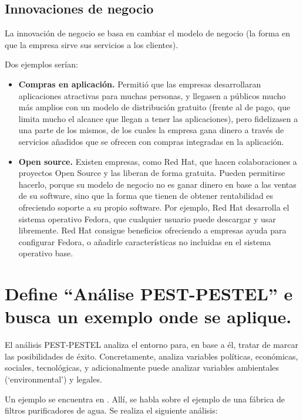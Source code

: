 \documentclass[a4paper]{article}
\begin{document}
\subsection{Innovaciones de negocio}
La innovación de negocio se basa en cambiar el modelo de negocio (la forma en que la empresa sirve sus servicios a los clientes).

Dos ejemplos serían:
\begin{itemize}
    \item \textbf{Compras en aplicación.} Permitió que las empresas desarrollaran aplicaciones atractivas para muchas personas, y llegasen a públicos mucho más amplios con un modelo de distribución gratuito (frente al de pago, que limita mucho el alcance que llegan a tener las aplicaciones), pero fidelizasen a una parte de los mismos, de los cuales la empresa gana dinero a través de servicios añadidos que se ofrecen con compras integradas en la aplicación.
    \item \textbf{Open source.} Existen empresas, como Red Hat, que hacen colaboraciones a proyectos Open Source y las liberan de forma gratuita. Pueden permitirse hacerlo, porque su modelo de negocio no es ganar dinero en base a las ventas de su software, sino que la forma que tienen de obtener rentabilidad es ofreciendo soporte a su propio software. Por ejemplo, Red Hat desarrolla el sistema operativo Fedora, que cualquier usuario puede descargar y usar libremente. Red Hat consigue beneficios ofreciendo a empresas ayuda para configurar Fedora, o añadirle características no incluidas en el sistema operativo base.
\end{itemize}

\section{Define ``Análise PEST-PESTEL'' e busca un exemplo onde se aplique.}

El análisis PEST-PESTEL analiza el entorno para, en base a él, tratar de marcar las posibilidades de éxito. Concretamente, analiza variables políticas, económicas, sociales, tecnológicas, y adicionalmente puede analizar variables ambientales (`environmental') y legales.

Un ejemplo se encuentra en \cite{RefWorks:doc:602fb2058f0825dac8eafc64}. Allí, se habla sobre el ejemplo de una fábrica de filtros purificadores de agua. Se realiza el siguiente análisis:
\end{document}
